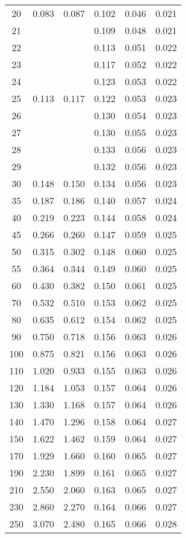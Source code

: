 \begin{table}[H]
\begin{tabular}{c||c|c|c|c|c}
    20	& 0.083 & 0.087 & 0.102	& 0.046	& 0.021 \\
    21	&       &       & 0.109	& 0.048	& 0.021 \\
    22	&       &       & 0.113	& 0.051	& 0.022 \\
    23	&       &       & 0.117	& 0.052	& 0.022 \\
    24	&       &       & 0.123	& 0.053	& 0.022 \\
    25	& 0.113 & 0.117 & 0.122	& 0.053	& 0.023 \\
    26	&       &       & 0.130	& 0.054	& 0.023 \\
    27	&       &       & 0.130	& 0.055	& 0.023 \\
    28	&       &       & 0.133	& 0.056	& 0.023 \\
    29	&       &       & 0.132	& 0.056	& 0.023 \\
    30	& 0.148 & 0.150 & 0.134	& 0.056	& 0.023 \\
    35	& 0.187 & 0.186 & 0.140	& 0.057	& 0.024 \\
    40	& 0.219 & 0.223 & 0.144	& 0.058	& 0.024 \\
    45	& 0.266 & 0.260 & 0.147	& 0.059	& 0.025 \\
    50	& 0.315 & 0.302 & 0.148	& 0.060	& 0.025 \\
    55	& 0.364 & 0.344 & 0.149	& 0.060	& 0.025 \\
    60	& 0.430 & 0.382 & 0.150	& 0.061	& 0.025 \\
    70	& 0.532 & 0.510 & 0.153	& 0.062	& 0.025 \\
    80	& 0.635 & 0.612 & 0.154	& 0.062	& 0.025 \\
    90	& 0.750 & 0.718 & 0.156	& 0.063	& 0.026 \\
    100	& 0.875 & 0.821 & 0.156	& 0.063	& 0.026 \\
    110	& 1.020 & 0.933 & 0.155	& 0.063	& 0.026 \\
    120	& 1.184 & 1.053 & 0.157	& 0.064	& 0.026 \\
    130	& 1.330 & 1.168 & 0.157	& 0.064	& 0.026 \\
    140	& 1.470 & 1.296 & 0.158	& 0.064	& 0.027 \\
    150	& 1.622 & 1.462 & 0.159	& 0.064	& 0.027 \\
    170	& 1.929 & 1.660 & 0.160	& 0.065	& 0.027 \\
    190	& 2.230 & 1.899 & 0.161	& 0.065	& 0.027 \\
    210	& 2.550 & 2.060 & 0.163	& 0.065	& 0.027 \\
    230	& 2.860 & 2.270 & 0.164	& 0.066	& 0.027 \\
    250	& 3.070 & 2.480 & 0.165	& 0.066	& 0.028 \\
    \bottomrule
  \end{tabular}
  \caption{}
  \label{tab:}
\end{table}
